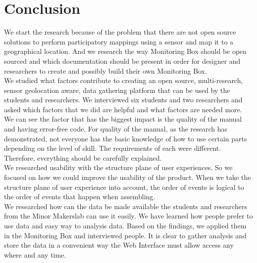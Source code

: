 \documentclass[conference]{IEEEtran}
\begin{document}
\section{Conclusion}
	We start the research because of the problem that there are not open source solutions to perform participatory mappings using a sensor and map it to a geographical location. And we research the way Monitoring Box should be open sourced and which documentation should be present in order for designer and researchers to create and possibly build their own Monitoring Box. \\
	We studied what factors contribute to creating an open source, multi-research, sensor geolocation aware, data gathering platform that can be used by the students and researchers. We interviewed six students and two researchers and asked which factors that we did are helpful and what factors are needed more. We can see the factor that has the biggest impact is the quality of the manual and having error-free code. For quality of the manual, as the research has demonstrated, not everyone has the basic knowledge of how to use certain parts depending on the level of skill. The requirements of each were different. Therefore, everything should be carefully explained. \\
	We researched usability with the structure plane of user experiences. So we focused on how we could improve the usability of the product. When we take the structure plane of user experience into account, the order of events is logical to the order of events that happen when assembling. \\
	We researched how can the data be made available the students and researchers from the Minor Makerslab can use it easily. We have learned how people prefer to use data and easy way to analysis data. Based on the findings, we applied them in the Monitoring Box and interviewed people. It is clear to gather analysis and store the data in a convenient way the Web Interface must allow access any where and any time.\\
\end{document}
